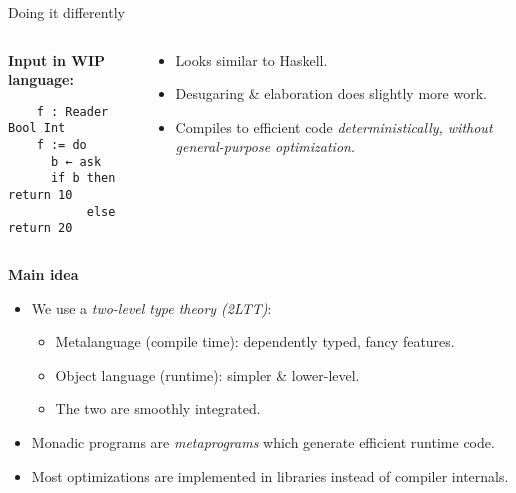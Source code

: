 \documentclass[dvipsnames,aspectratio=169]{beamer}
\theoremstyle{remark}
\begin{document}
\begin{frame}[fragile]{Doing it differently}

\begin{columns}
\begin{column}{0.3\textwidth}
\textbf{Input in WIP language:}
\begin{verbatim}
    f : Reader Bool Int
    f := do
      b ← ask
      if b then return 10
           else return 20
\end{verbatim}

\end{column}
\begin{column}{0.6\textwidth}
\begin{itemize}
\item Looks similar to Haskell.
\item Desugaring \& elaboration does slightly more work.
\item Compiles to efficient code \emph{deterministically, without
      general-purpose optimization}.
\end{itemize}
\end{column}
\end{columns}
\vspace{1em}
\pause

\begin{block}{}
\textbf{Main idea}
\begin{itemize}
\item We use a \emph{two-level type theory (2LTT)}:
  \begin{itemize}
    \item Metalanguage (compile time): dependently typed, fancy features.
    \item Object language (runtime): simpler \& lower-level.
    \item The two are smoothly integrated.
  \end{itemize}
\item Monadic programs are \emph{metaprograms} which generate efficient
  runtime code.
\item Most optimizations are implemented in libraries instead of compiler internals.
\end{itemize}
\end{block}

\end{frame}

\end{document}
